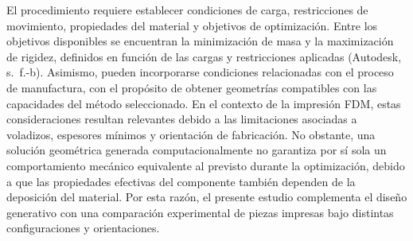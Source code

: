 \documentclass[10pt,twocolumn]{article}
\begin{document}
El procedimiento requiere establecer condiciones de carga, restricciones de movimiento, propiedades del material y objetivos de optimización. Entre los objetivos disponibles se encuentran la minimización de masa y la maximización de rigidez, definidos en función de las cargas y restricciones aplicadas (Autodesk, s.~f.-b). Asimismo, pueden incorporarse condiciones relacionadas con el proceso de manufactura, con el propósito de obtener geometrías compatibles con las capacidades del método seleccionado. En el contexto de la impresión FDM, estas consideraciones resultan relevantes debido a las limitaciones asociadas a voladizos, espesores mínimos y orientación de fabricación. No obstante, una solución geométrica generada computacionalmente no garantiza por sí sola un comportamiento mecánico equivalente al previsto durante la optimización, debido a que las propiedades efectivas del componente también dependen de la deposición del material. Por esta razón, el presente estudio complementa el diseño generativo con una comparación experimental de piezas impresas bajo distintas configuraciones y orientaciones.
\end{document}
